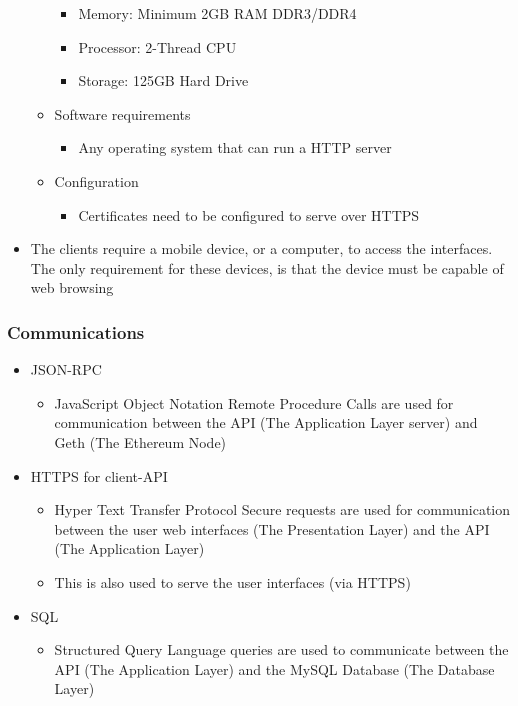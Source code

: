 \documentclass{article}
\begin{document}
\begin{itemize}
\begin{itemize}
\begin{itemize}
\item Memory: Minimum 2GB RAM DDR3/DDR4
\item Processor: 2-Thread CPU
\item Storage: 125GB Hard Drive
\end{itemize} 
\item Software requirements
\begin{itemize}
\item Any operating system that can run a HTTP server
\end{itemize}
\item Configuration
\begin{itemize}
\item Certificates need to be configured to serve over HTTPS
\end{itemize}
\end{itemize}
\item The clients require a mobile device, or a computer, to access the interfaces. The only requirement for these devices, is that the device must be capable of web browsing
\end{itemize}

\subsubsection*{Communications}
\begin{itemize}
\item JSON-RPC
\begin{itemize}
\item JavaScript Object Notation Remote Procedure Calls are used for communication between the API (The Application Layer server) and Geth (The Ethereum Node)
\end{itemize}

\item HTTPS for client-API
\begin{itemize}
\item Hyper Text Transfer Protocol Secure requests are used for communication between the user web interfaces (The Presentation Layer) and the API (The Application Layer)
\item This is also used to serve the user interfaces (via HTTPS)
\end{itemize}

\item SQL
\begin{itemize}
\item Structured Query Language queries are used to communicate between the API (The Application Layer) and the MySQL Database (The Database Layer)
\end{itemize}

\end{itemize}
\end{document}
